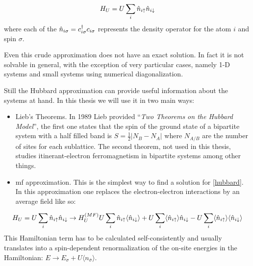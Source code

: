 
\begin{equation}
   H_U = U\sum_i \hat{n}_{i\uparrow}\hat{n}_{i\downarrow}
\label{hubbard}
\end{equation}
where each of the $\hat{n}_{i\sigma}=c^{\dagger}_{i\sigma}c_{i\sigma}$ represents the density operator for the atom $i$ and spin $\sigma$.

Even this crude approximation does not have an exact solution. In fact it is not solvable in general, with the exception of very particular cases, namely 1-D systems and small systems using numerical diagonalization.

Still the Hubbard approximation can provide useful information about the systems at hand. In this thesis we will use it in two main ways:

\begin{itemize}
   \item Lieb's Theorems.\cite{Lieb1989} In 1989 Lieb provided ``\emph{Two Theorems on the Hubbard Model}'', the first one states that the spin of the ground state of a bipartite system with a half filled band is $S=\frac{1}{2}|N_B-N_A|$ where $N_{A/B}$ are the number of sites for each sublattice. The second theorem, not used in this thesis, studies itinerant-electron ferromagnetism in bipartite systems among other things.
   \item \acf{mf} approximation. This is the simplest way to find a solution for \eqref{hubbard}. In this approximation one replaces the electron-electron interactions by an average field like so:
\end{itemize}

\begin{equation}
   H_U = U\sum_i \hat{n}_{i\uparrow}\hat{n}_{i\downarrow} \rightarrow H^{(MF)}_U
   U\sum_i \hat{n}_{i\uparrow}\langle\hat{n}_{i\downarrow}\rangle + 
   U\sum_i \langle\hat{n}_{i\uparrow}\rangle\hat{n}_{i\downarrow} -
   U\sum_i \langle\hat{n}_{i\uparrow}\rangle\langle\hat{n}_{i\downarrow}\rangle
\end{equation}
This Hamiltonian term has to be calculated self-consistently and usually translates into a spin-dependent renormalization of the on-site energies in the Hamiltonian: $E \to E_\sigma + U\langle n_{\bar{\sigma}}\rangle$.

